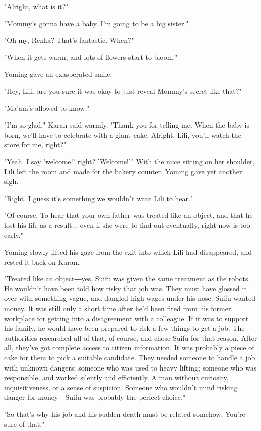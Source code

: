 "Alright, what is it?"

"Mommy's gonna have a baby. I'm going to be a big sister."

"Oh my, Renka? That's fantastic. When?"

"When it gets warm, and lots of flowers start to bloom."

Yoming gave an exasperated smile.

"Hey, Lili, are you sure it was okay to just reveal Mommy's secret like
that?"

"Ma'am's allowed to know."

"I'm so glad," Karan said warmly. "Thank you for telling me. When the
baby is born, we'll have to celebrate with a giant cake. Alright, Lili,
you'll watch the store for me, right?"

"Yeah. I say 'welcome!' right? 'Welcome!'" With the mice sitting on her
shoulder, Lili left the room and made for the bakery counter. Yoming
gave yet another sigh.

"Right. I guess it's something we wouldn't want Lili to hear."

"Of course. To hear that your own father was treated like an object, and
that he lost his life as a result... even if she were to find out
eventually, right now is too early."

Yoming slowly lifted his gaze from the exit into which Lili had
disappeared, and rested it back on Karan.

"Treated like an object―yes, Suifu was given the same treatment as the
robots. He wouldn't have been told how risky that job was. They must
have glossed it over with something vague, and dangled high wages under
his nose. Suifu wanted money. It was still only a short time after he'd
been fired from his former workplace for getting into a disagreement
with a colleague. If it was to support his family, he would have been
prepared to risk a few things to get a job. The authorities researched
all of that, of course, and chose Suifu for that reason. After all,
they've got complete access to citizen information. It was probably a
piece of cake for them to pick a suitable candidate. They needed someone
to handle a job with unknown dangers; someone who was used to heavy
lifting; someone who was responsible, and worked silently and
efficiently. A man without curiosity, inquisitiveness, or a sense of
suspicion. Someone who wouldn't mind risking danger for money―Suifu was
probably the perfect choice."

"So that's why his job and his sudden death must be related somehow.
You're sure of that."

